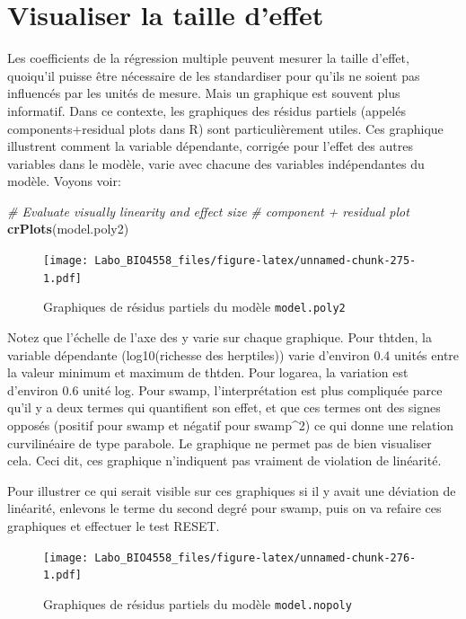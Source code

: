\documentclass[
  12pt,
]{book}
\newenvironment{Shaded}{\begin{snugshade}}{\end{snugshade}}
\newcommand{\CommentTok}[1]{\textcolor[rgb]{0.56,0.35,0.01}{\textit{#1}}}
\newcommand{\KeywordTok}[1]{\textcolor[rgb]{0.13,0.29,0.53}{\textbf{#1}}}
\newcommand{\NormalTok}[1]{#1}
\begin{document}
\hypertarget{visualiser-la-taille-deffet}{%
\section{Visualiser la taille d'effet}\label{visualiser-la-taille-deffet}}

Les coefficients de la régression multiple peuvent mesurer la taille d'effet, quoiqu'il puisse être nécessaire de les standardiser pour qu'ils ne soient pas influencés par les unités de mesure. Mais un graphique est souvent plus informatif. Dans ce contexte, les graphiques des résidus partiels (appelés components+residual plots dans R) sont particulièrement utiles. Ces graphique illustrent comment la variable dépendante, corrigée pour l'effet des autres variables dans le modèle, varie avec chacune des variables indépendantes du modèle. Voyons voir:

\begin{Shaded}
\begin{Highlighting}[]
\CommentTok{\# Evaluate visually linearity and effect size}
\CommentTok{\# component + residual plot}
\KeywordTok{crPlots}\NormalTok{(model.poly2)}
\end{Highlighting}
\end{Shaded}

\begin{figure}
\centering
\texttt{[image: Labo\_BIO4558\_files/figure-latex/unnamed-chunk-275-1.pdf]}
\caption{\label{fig:unnamed-chunk-275}Graphiques de résidus partiels du modèle \texttt{model.poly2}}
\end{figure}

Notez que l'échelle de l'axe des y varie sur chaque graphique. Pour thtden, la variable dépendante (log10(richesse des herptiles)) varie d'environ 0.4 unités entre la valeur minimum et maximum de thtden. Pour logarea, la variation est d'environ 0.6 unité log. Pour swamp, l'interprétation est plus compliquée parce qu'il y a deux termes qui quantifient son effet, et que ces termes ont des signes opposés (positif pour swamp et négatif pour swamp\^{}2) ce qui donne une relation curvilinéaire de type parabole. Le graphique ne permet pas de bien visualiser cela. Ceci dit, ces graphique n'indiquent pas vraiment de violation de linéarité.

Pour illustrer ce qui serait visible sur ces graphiques si il y avait une déviation de linéarité, enlevons le terme du second degré pour swamp, puis on va refaire ces graphiques et effectuer le test RESET.

\begin{figure}
\centering
\texttt{[image: Labo\_BIO4558\_files/figure-latex/unnamed-chunk-276-1.pdf]}
\caption{\label{fig:unnamed-chunk-276}Graphiques de résidus partiels du modèle \texttt{model.nopoly}}
\end{figure}
\end{document}
